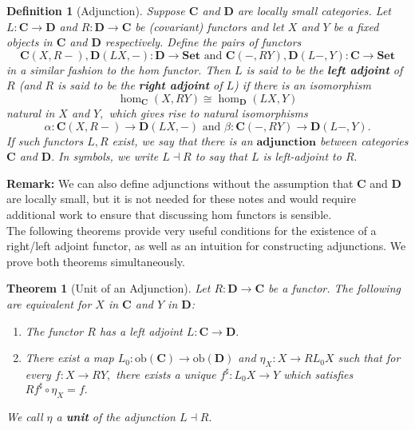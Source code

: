 \documentclass{article}
\newtheorem{theorem}[proposition]{Theorem}
\newtheorem{definition}[proposition]{Definition}
\numberwithin{equation}{section}
\newcommand{\cat}[1]{{\mathbf{#1}}}
\newcommand{\ob}{\mathrm{ob}}
\begin{document}

\begin{definition}[Adjunction]
Suppose $\cat{C}$ and $\cat{D}$ are locally small categories. Let $L : \cat{C} \to \cat{D}$ and $R : \cat{D} \to \cat{C}$ be (covariant) functors and let $X$ and $Y$ be a fixed objects in $\cat{C}$ and $\cat{D}$ respectively. Define the pairs of functors $$\cat{C}(X, R-), \cat{D}(LX, -) : \cat{D} \to \cat{Set} \text{ and } \cat{C}(-, RY), \cat{D}(L-, Y) : \cat{C} \to \cat{Set}$$ in a similar fashion to the hom functor. Then $L$ is said to be the \textbf{left adjoint} of $R$ (and $R$ is said to be the \textbf{right adjoint} of $L$) if there is an isomorphism $$\hom_\cat{C}(X, RY) \cong \hom_\cat{D}(LX, Y)$$ natural in $X$ and $Y,$ which gives rise to natural isomorphisms $$\alpha: \cat{C}(X, R-) \to \cat{D}(LX, -) \text{ and } \beta : \cat{C}(-, RY) \to \cat{D}(L-, Y).$$ If such functors $L, R$ exist, we say that there is an $\textbf{adjunction}$ between categories $\cat{C}$ and $\cat{D}.$ In symbols, we write $L \dashv R$ to say that $L$ is left-adjoint to $R.$
\end{definition}

\textbf{Remark:} We can also define adjunctions without the assumption that $\cat{C}$ and $\cat{D}$ are locally small, but it is not needed for these notes and would require additional work to ensure that discussing hom functors is sensible. \\

The following theorems provide very useful conditions for the existence of a right/left adjoint functor, as well as an intuition for constructing adjunctions. We prove both theorems simultaneously. 

\begin{theorem}[Unit of an Adjunction]\label{thm:unit-of-adjunction}
Let $R : \cat{D} \to \cat{C}$ be a functor. The following are equivalent for $X$ in $\cat{C}$ and $Y$ in $\cat{D}$:
\begin{enumerate}
    \item{The functor $R$ has a left adjoint $L : \cat{C} \to \cat{D}.$}
    \item{There exist a map $L_0 : \ob(\cat C) \to \ob(\cat D)$ and $\eta_X : X \to RL_0X$ such that for every $f : X \to RY,$ there exists a unique $f^\sharp : L_0X \to Y$ which satisfies $Rf^\sharp \circ \eta_X = f.$} 
\end{enumerate}
We call $\eta$ a \textbf{unit} of the adjunction $L \dashv R.$ 
\end{theorem}
\end{document}

